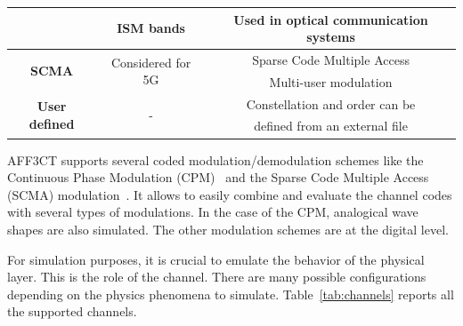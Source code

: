 \documentclass[11pt]{report}
\newcommand{\AFFECT}{AFF3CT\xspace}
\begin{document}
\begin{table}[htp]
{\begin{tabular}{| c | c | c |}
                                             & ISM bands                          & Used in optical communication systems     \\
      \hline
      \multirow{2}{*}{\textbf{SCMA}}         & \multirow{2}{*}{Considered for 5G} & Sparse Code Multiple Access               \\
                                             &                                    & Multi-user modulation                     \\
      \hline
      \multirow{2}{*}{\textbf{User defined}} & \multirow{2}{*}{-}                 & Constellation and order can be            \\
                                             &                                    & defined from an external file             \\
      \hline
    \end{tabular}
  }%
\end{table}

\AFFECT supports several coded modulation/demodulation schemes like the
Continuous Phase Modulation (CPM)~\cite{Aulin1981a,Aulin1981b} and the Sparse
Code Multiple Access (SCMA) modulation~\cite{Nikopour2013,ghaffari:hal-01977885,ghaffari:hal-03762203}.
It allows to easily combine and evaluate the channel codes with several types
of modulations. In the case of the CPM, analogical wave shapes are also
simulated. The other modulation schemes are at the digital level.

For simulation purposes, it is crucial to emulate the behavior of the physical
layer. This is the role of the channel. There are many possible configurations
depending on the physics phenomena to simulate. Table~\ref{tab:channels}
reports all the supported channels.
\end{document}
